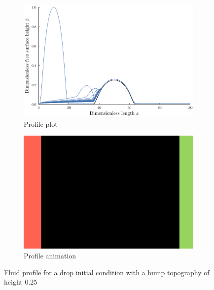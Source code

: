 \begin{frame}
    \begin{figure}
        \centering
        \begin{subfigure}[ht]{.5\textwidth}
            \includegraphics[width=\textwidth]{images/bump_25_shorter/plt_notitle.png}
            \caption{Profile plot}
            \label{fig:drop_25_profile}
        \end{subfigure}%
        \begin{subfigure}[ht]{.5\textwidth}
            \includegraphics[width=\textwidth]{images/placeholder.png}
            \caption{Profile animation}
            \label{fig:drop_25_anim}
        \end{subfigure} 
        \caption{Fluid profile for a drop initial condition with a bump topography of height 0.25} 
    \end{figure}
\end{frame} 
